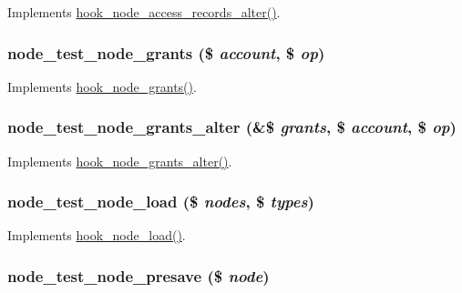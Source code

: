 \label{node__test_8module_ab0d2902a1e4481b0258f4a8270cfd509}
Implements \hyperlink{group__node__access_ga37c90bf0e1dccad0deefa368dd94cc83}{hook\_\-node\_\-access\_\-records\_\-alter()}. \hypertarget{node__test_8module_acc4ea4604d3c94a6eb3ba93e665bec9f}{
\subsubsection[{node\_\-test\_\-node\_\-grants}]{\setlength{\rightskip}{0pt plus 5cm}node\_\-test\_\-node\_\-grants (\$ {\em account}, \/  \$ {\em op})}}
\label{node__test_8module_acc4ea4604d3c94a6eb3ba93e665bec9f}
Implements \hyperlink{group__node__access_gaa973f2ab6ab14c3fa14e5138c6d69ecf}{hook\_\-node\_\-grants()}. \hypertarget{node__test_8module_aad255cfb8f19e556fe990c02cf64600d}{
\subsubsection[{node\_\-test\_\-node\_\-grants\_\-alter}]{\setlength{\rightskip}{0pt plus 5cm}node\_\-test\_\-node\_\-grants\_\-alter (\&\$ {\em grants}, \/  \$ {\em account}, \/  \$ {\em op})}}
\label{node__test_8module_aad255cfb8f19e556fe990c02cf64600d}
Implements \hyperlink{group__node__access_ga21e95e2bd0b4ed12d861aa83426a8ba3}{hook\_\-node\_\-grants\_\-alter()}. \hypertarget{node__test_8module_afe2b02b40a91d29185136d99714bf73f}{
\subsubsection[{node\_\-test\_\-node\_\-load}]{\setlength{\rightskip}{0pt plus 5cm}node\_\-test\_\-node\_\-load (\$ {\em nodes}, \/  \$ {\em types})}}
\label{node__test_8module_afe2b02b40a91d29185136d99714bf73f}
Implements \hyperlink{group__node__api__hooks_gad48bb14b68ed38526029d1f7ac2d2de4}{hook\_\-node\_\-load()}. \hypertarget{node__test_8module_a5dc9a5a8b514e3717ac1533d79fa0077}{
\subsubsection[{node\_\-test\_\-node\_\-presave}]{\setlength{\rightskip}{0pt plus 5cm}node\_\-test\_\-node\_\-presave (\$ {\em node})}}
